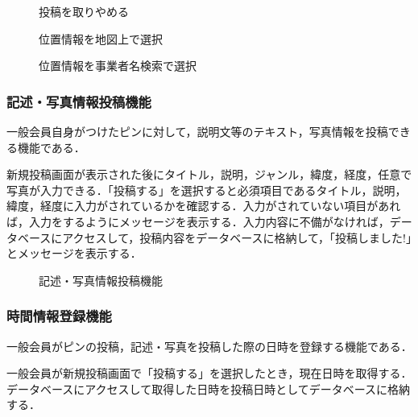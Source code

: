 \begin{figure}[H]
    \centering
    
    \caption{投稿を取りやめる}
    \label{fig:pinpost_gen1_2}
\end{figure}

\begin{figure}[H]
    \centering
    
    \caption{位置情報を地図上で選択}
    \label{fig:pinpost_gen1_3}
\end{figure}

\begin{figure}[H]
    \centering
    
    \caption{位置情報を事業者名検索で選択}
    \label{fig:pinpost_gen1_4}
\end{figure}

\subsubsection{記述・写真情報投稿機能}
一般会員自身がつけたピンに対して，説明文等のテキスト，写真情報を投稿できる機能である．

新規投稿画面が表示された後にタイトル，説明，ジャンル，緯度，経度，任意で写真が入力できる．「投稿する」を選択すると必須項目であるタイトル，説明，緯度，経度に入力がされているかを確認する．入力がされていない項目があれば，入力をするようにメッセージを表示する．入力内容に不備がなければ，データベースにアクセスして，投稿内容をデータベースに格納して，「投稿しました!」とメッセージを表示する．

\begin{figure}[H]
    \centering
    
    \caption{記述・写真情報投稿機能}
    \label{fig:pinpost_gen2}
\end{figure}

\subsubsection{時間情報登録機能}
一般会員がピンの投稿，記述・写真を投稿した際の日時を登録する機能である．

一般会員が新規投稿画面で「投稿する」を選択したとき，現在日時を取得する．データベースにアクセスして取得した日時を投稿日時としてデータベースに格納する．

